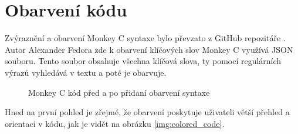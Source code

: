 \section{Obarvení kódu} \label{sec:obarveni_kodu}
Zvýraznění a obarvení Monkey C syntaxe bylo převzato z GitHub repozitáře \cite{syntax_highlight}. Autor Alexander Fedora \cite{fedora} zde k obarvení klíčových slov Monkey C využívá JSON souboru. Tento soubor obsahuje všechna klíčová slova, ty pomocí regulárních výrazů vyhledává v textu a poté je obarvuje.

\begin{figure}
	\centering
	\hspace{1.5em} %
	\caption{Monkey C kód před a po přidaní obarvení syntaxe}
	\label{img:obarveni}
\end{figure}
	
Hned na první pohled je zřejmé, že obarvení poskytuje uživateli větší přehled a orientaci v kódu, jak je vidět na obrázku \ref{img:colored_code}.


